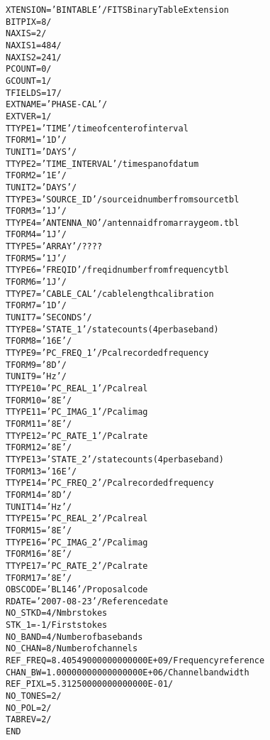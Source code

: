 \documentclass[twoside]{article}
\begin{document}
\begin{alltt}
XTENSION= 'BINTABLE'           / FITS Binary Table Extension
BITPIX  =                    8 /
NAXIS   =                    2 /
NAXIS1  =                  484 /
NAXIS2  =                  241 /
PCOUNT  =                    0 /
GCOUNT  =                    1 /
TFIELDS =                   17 /
EXTNAME = 'PHASE-CAL'          /
EXTVER  =                    1 /
TTYPE1  = 'TIME    '           / time of center of interval
TFORM1  = '1D      '           /
TUNIT1  = 'DAYS    '           /
TTYPE2  = 'TIME_INTERVAL'      / time span of datum
TFORM2  = '1E      '           /
TUNIT2  = 'DAYS    '           /
TTYPE3  = 'SOURCE_ID'          / source id number from source tbl
TFORM3  = '1J      '           /
TTYPE4  = 'ANTENNA_NO'         / antenna id from array geom. tbl
TFORM4  = '1J      '           /
TTYPE5  = 'ARRAY   '           / ????
TFORM5  = '1J      '           /
TTYPE6  = 'FREQID  '           / freq id number from frequency tbl
TFORM6  = '1J      '           /
TTYPE7  = 'CABLE_CAL'          / cable length calibration
TFORM7  = '1D      '           /
TUNIT7  = 'SECONDS '           /
TTYPE8  = 'STATE_1 '           / state counts (4 per baseband)
TFORM8  = '16E     '           /
TTYPE9  = 'PC_FREQ_1'          / Pcal recorded frequency
TFORM9  = '8D      '           /
TUNIT9  = 'Hz      '           /
TTYPE10 = 'PC_REAL_1'          / Pcal real
TFORM10 = '8E      '           /
TTYPE11 = 'PC_IMAG_1'          / Pcal imag
TFORM11 = '8E      '           /
TTYPE12 = 'PC_RATE_1'          / Pcal rate
TFORM12 = '8E      '           /
TTYPE13 = 'STATE_2 '           / state counts (4 per baseband)
TFORM13 = '16E     '           /
TTYPE14 = 'PC_FREQ_2'          / Pcal recorded frequency
TFORM14 = '8D      '           /
TUNIT14 = 'Hz      '           /
TTYPE15 = 'PC_REAL_2'          / Pcal real
TFORM15 = '8E      '           /
TTYPE16 = 'PC_IMAG_2'          / Pcal imag
TFORM16 = '8E      '           /
TTYPE17 = 'PC_RATE_2'          / Pcal rate
TFORM17 = '8E      '           /
OBSCODE = 'BL146   '           / Proposal code
RDATE   = '2007-08-23'         / Reference date
NO_STKD =                    4 / Nmbr stokes
STK_1   =                   -1 / First stokes
NO_BAND =                    4 / Number of basebands
NO_CHAN =                    8 / Number of channels
REF_FREQ=   8.40549000000000000E+09 / Frequency reference
CHAN_BW =   1.00000000000000000E+06 / Channel bandwidth
REF_PIXL=   5.31250000000000000E-01 /
NO_TONES=                    2 /
NO_POL  =                    2 /
TABREV  =                    2 /
END
\end{alltt}
\end{document}
